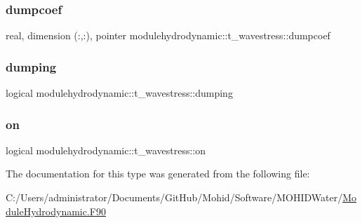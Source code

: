 \subsubsection{\texorpdfstring{dumpcoef}{dumpcoef}}
{\footnotesize\ttfamily real, dimension (\+:,\+:), pointer modulehydrodynamic\+::t\+\_\+wavestress\+::dumpcoef\hspace{0.3cm}{\ttfamily [private]}}

\mbox{\label{structmodulehydrodynamic_1_1t__wavestress_a13ebd6b434db2996a151292e9f24293b}} 
\subsubsection{\texorpdfstring{dumping}{dumping}}
{\footnotesize\ttfamily logical modulehydrodynamic\+::t\+\_\+wavestress\+::dumping\hspace{0.3cm}{\ttfamily [private]}}

\mbox{\label{structmodulehydrodynamic_1_1t__wavestress_aa28bdb3fe03edd7866af07332d1e8a63}} 
\subsubsection{\texorpdfstring{on}{on}}
{\footnotesize\ttfamily logical modulehydrodynamic\+::t\+\_\+wavestress\+::on\hspace{0.3cm}{\ttfamily [private]}}



The documentation for this type was generated from the following file\+:\begin{DoxyCompactItemize}
\item 
C\+:/\+Users/administrator/\+Documents/\+Git\+Hub/\+Mohid/\+Software/\+M\+O\+H\+I\+D\+Water/\mbox{\hyperlink{_module_hydrodynamic_8_f90}{Module\+Hydrodynamic.\+F90}}\end{DoxyCompactItemize}
